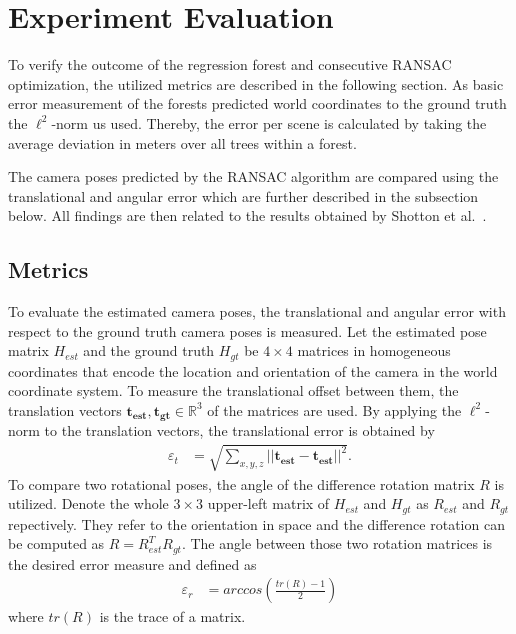 \documentclass[final]{cvpr}
\begin{document}
\section{Experiment Evaluation} \label{sec:eval}
To verify the outcome of the regression forest and consecutive RANSAC optimization, the utilized metrics are described
in the following section. As basic error measurement of the forests predicted world coordinates to the ground truth the 
$\ell^2$-norm us used. Thereby, the error per scene is calculated by taking the average deviation in meters 
over all trees within a forest. 

The camera poses predicted by the RANSAC algorithm are compared using the translational and angular error 
which are further described in the subsection below. All findings are then related to the results obtained by 
Shotton et al.~\cite{shotton2013}. 


\subsection{Metrics} \label{subsec:metrics}
To evaluate the estimated camera poses, the translational and angular error with respect to the 
ground truth camera poses is measured. Let the estimated pose matrix $H_{est}$ and the ground truth 
$H_{gt}$ be $4 \times 4$ matrices
in homogeneous coordinates that encode the location and orientation of the camera in the world 
coordinate system. To measure the translational offset between them, the translation vectors 
$\boldsymbol{t_{est}}, \boldsymbol{t_{gt}} \in \mathbb{R}^3$ of the matrices are used.
By applying the $\ell^2$-norm to the translation vectors, the translational error is obtained by
\begin{align}
    \varepsilon_t &= \sqrt{\sum_{x,y,z}||\boldsymbol{t_{est}} - \boldsymbol{t_{est}}||^2}.
\end{align}
To compare two rotational poses, the angle of the difference rotation matrix $R$ is utilized. 
Denote the whole $3\times3$ upper-left matrix of $H_{est}$ and $H_{gt}$ as $R_{est}$ and 
$R_{gt}$ repectively. They refer to the orientation in space and the difference rotation can be computed 
as $R = R_{est}^TR_{gt}$. The angle between those two rotation matrices is the desired
error measure and defined as
\begin{align}
    \varepsilon_r &= arccos \left( \frac{tr(R)-1}{2} \right)
\end{align}
where $tr(R)$ is the trace of a matrix.
\end{document}
